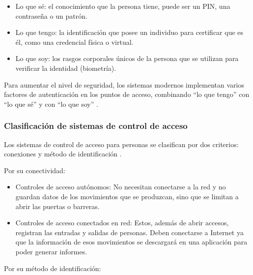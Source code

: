\begin{itemize}
\item Lo que sé: el conocimiento que la persona tiene, puede ser un PIN, una contraseña o un patrón.
\item Lo que tengo: la identificación que posee un individuo para certificar que es él, como una credencial física o virtual.
\item Lo que soy: los rasgos corporales únicos de la persona que se utilizan para verificar la identidad (biometría).
\end{itemize}

Para aumentar el nivel de seguridad, los sistemas modernos implementan varios factores de autenticación en los puntos de acceso, combinando ``lo que tengo'' con ``lo que sé'' y con ``lo que soy'' \citep{WEBSITE:ControlAcceso}.

\subsubsection{Clasificación de sistemas de control de acceso}

Los sistemas de control de acceso para personas se clasifican por dos criterios: conexiones y método de identificación \citep{WEBSITE:ControlAccesoPersonas}.

Por su conectividad:

\begin{itemize}
\item Controles de acceso autónomos: No necesitan conectarse a la red y no guardan datos de los movimientos que se produzcan, sino que se limitan a abrir las puertas o barreras. 
\item Controles de acceso conectados en red: Estos, además de abrir accesos, registran las entradas y salidas de personas. Deben conectarse a Internet ya que la información de esos movimientos se descargará en una aplicación para poder generar informes.
\end{itemize}

Por su método de identificación:

